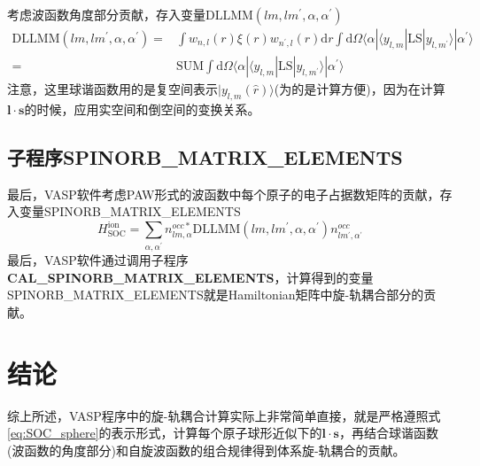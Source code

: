 \documentclass[10pt, oneside, a4paper]{article}      %
\begin{document}
考虑波函数角度部分贡献，存入变量$\mathrm{DLLMM}(lm,lm^{\prime},\alpha,\alpha^{\prime})$
\begin{displaymath}
	\begin{aligned}
		\mathrm{DLLMM}(lm,lm^{\prime},\alpha,\alpha^{\prime})=&\int w_{n,l}(r)\xi(r)w_{n^{\prime},l}(r)\mathrm{d}r\int\mathrm{d}\Omega\langle\alpha|\langle y_{l,m}|\mathrm{LS}|y_{l,m^{\prime}}\rangle|\alpha^{\prime}\rangle\\
		=&\mathrm{SUM}\int\mathrm{d}\Omega\langle\alpha|\langle y_{l,m}|\mathrm{LS}|y_{l,m^{\prime}}\rangle|\alpha^{\prime}\rangle
	\end{aligned}
\end{displaymath}
注意，这里球谐函数用的是复空间表示$|y_{l,m}(\hat r)\rangle$(为的是计算方便)，因为在计算$\mathbf{l}\cdot\mathbf{s}$的时候，应用实空间和倒空间的变换关系。

\subsection{子程序\bf{SPINORB\_MATRIX\_ELEMENTS}}
最后，\textrm{VASP}软件考虑\textrm{PAW}形式的波函数中每个原子的电子占据数矩阵的贡献，存入变量\textrm{SPINORB\_MATRIX\_ELEMENTS}
\begin{displaymath}
	H_{\mathrm{SOC}}^{\mathrm{ion}}=\sum_{\alpha,\alpha^{\prime}}n_{lm,\alpha}^{occ\ast}\mathrm{DLLMM}(lm,lm^{\prime},\alpha,\alpha^{\prime})n_{lm^{\prime},\alpha^{\prime}}^{occ}
\end{displaymath}
最后，\textrm{VASP}软件通过调用子程序\textbf{CAL\_SPINORB\_MATRIX\_ELEMENTS}，计算得到的变量\textrm{SPINORB\_MATRIX\_ELEMENTS}就是\textrm{Hamiltonian}矩阵中旋-轨耦合部分的贡献。

\section{结论}
综上所述，\textrm{VASP}程序中的旋-轨耦合计算实际上非常简单直接，就是严格遵照式\eqref{eq:SOC_sphere}的表示形式，计算每个原子球形近似下的$\mathbf{l}\cdot\mathbf{s}$，再结合球谐函数(波函数的角度部分)和自旋波函数的组合规律得到体系旋-轨耦合的贡献。
\end{document}
